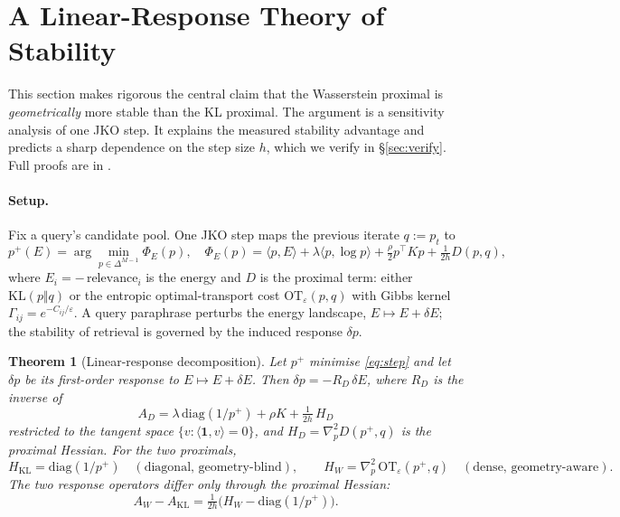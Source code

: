 \documentclass{article}
\theoremstyle{plain}
\newtheorem{theorem}{Theorem}
\begin{document}
\section{A Linear-Response Theory of Stability}
\label{sec:theory}

This section makes rigorous the central claim that the Wasserstein proximal is \emph{geometrically} more stable than the KL proximal. The argument is a sensitivity analysis of one JKO step. It explains the measured stability advantage and predicts a sharp dependence on the step size $h$, which we verify in \S\ref{sec:verify}. Full proofs are in .

\paragraph{Setup.}
Fix a query's candidate pool. One JKO step maps the previous iterate $q\!:=\!p_t$ to
\begin{equation}
  p^+(E) = \arg\min_{p\in\Delta^{M-1}} \Phi_E(p), \quad
  \Phi_E(p) = \langle p,E\rangle + \lambda\langle p,\log p\rangle + \tfrac{\rho}{2}p^\top K p + \tfrac{1}{2h}D(p,q),
\label{eq:step}
\end{equation}
where $E_i = -\,\mathrm{relevance}_i$ is the energy and $D$ is the proximal term: either $\mathrm{KL}(p\Vert q)$ or the entropic optimal-transport cost $\mathrm{OT}_\varepsilon(p,q)$ with Gibbs kernel $\Gamma_{ij}=e^{-C_{ij}/\varepsilon}$. A query paraphrase perturbs the energy landscape, $E\mapsto E+\delta E$; the stability of retrieval is governed by the induced response $\delta p$.

\begin{theorem}[Linear-response decomposition]
\label{thm:response}
Let $p^+$ minimise \eqref{eq:step} and let $\delta p$ be its first-order response to $E\mapsto E+\delta E$. Then $\delta p = -R_D\,\delta E$, where $R_D$ is the inverse of
\begin{equation}
  A_D = \lambda\,\mathrm{diag}(1/p^+) + \rho K + \tfrac{1}{2h}\,H_D
\label{eq:respop}
\end{equation}
restricted to the tangent space $\{v:\langle\mathbf 1,v\rangle=0\}$, and $H_D=\nabla^2_p D(p^+,q)$ is the proximal Hessian. For the two proximals,
\[
  H_{\mathrm{KL}} = \mathrm{diag}(1/p^+) \quad(\text{diagonal, geometry-blind}),
  \qquad
  H_{W} = \nabla^2_p\,\mathrm{OT}_\varepsilon(p^+,q) \quad(\text{dense, geometry-aware}).
\]
The two response operators differ \emph{only} through the proximal Hessian:
\begin{equation}
  A_W - A_{\mathrm{KL}} = \tfrac{1}{2h}\big(H_W - \mathrm{diag}(1/p^+)\big).
\label{eq:diff}
\end{equation}
\end{theorem}
\end{document}
